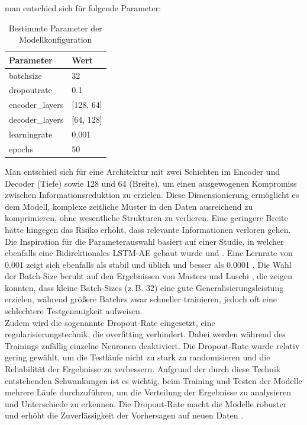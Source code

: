 \documentclass[a4paper,12pt]{article}
\begin{document}
	man entschied sich für folgende Parameter:
	\begin{table}[h]
		\centering
		\begin{tabular}{ll}
			\toprule
			\textbf{Parameter}       & \textbf{Wert}            \\
			\midrule
			\gls{batchsize}            	  & 32                      \\
			\gls{dropoutrate}            & 0.1                      \\
			encoder\_layers         & [128, 64]         \\
			decoder\_layers         & [64, 128]         \\
			\gls{learningrate}          & 0.001                   \\
			epochs          			& 50                  \\
			\bottomrule
		\end{tabular}
		\caption{Bestimmte Parameter der Modellkonfiguration}
		\label{tab:model_params}
	\end{table}
	Man entschied sich für eine Architektur mit zwei Schichten im Encoder und Decoder (Tiefe) sowie 128 und 64 (Breite), um einen ausgewogenen Kompromiss zwischen Informationsreduktion zu erzielen. Diese Dimensionierung ermöglicht es dem Modell, komplexe zeitliche Muster in den Daten ausreichend zu komprimieren, ohne wesentliche Strukturen zu verlieren. Eine geringere Breite hätte hingegen das Risiko erhöht, dass relevante Informationen verloren gehen. Die Inspiration für die Parameterauswahl basiert auf einer Studie, in welcher ebenfalls eine Bidirektionales LSTM-AE gebaut wurde und  \cite{Toor2022}. Eine Lernrate von 0.001 zeigt sich ebenfalls als stabil und üblich und besser als 0.0001 \cite{Santoso2022}. Die Wahl der Batch-Size beruht auf den Ergebnissen von Masters und Luschi \cite{masters2018revisiting}, die zeigen konnten, dass kleine Batch-Sizes (z.\,B. 32) eine gute Generalisierungsleistung erzielen, während größere Batches zwar schneller trainieren, jedoch oft eine schlechtere Testgenauigkeit aufweisen.
	\\[0.5em]
	Zudem wird die sogenannte Dropout-Rate eingesetzt, eine \gls{regularisierungstechnik}, die \gls{overfitting} verhindert. Dabei werden während des Trainings zufällig einzelne Neuronen deaktiviert. Die Dropout-Rate wurde relativ gering gewählt, um die Testläufe nicht zu stark zu randomisieren und die Reliabilität der Ergebnisse zu verbessern. Aufgrund der durch diese Technik entstehenden Schwankungen ist es wichtig, beim Training und Testen der Modelle mehrere Läufe durchzuführen, um die Verteilung der Ergebnisse zu analysieren und Unterschiede zu erkennen. Die Dropout-Rate macht die Modelle robuster und erhöht die Zuverlässigkeit der Vorhersagen auf neuen Daten \cite{Salehin2023}.
\end{document}
